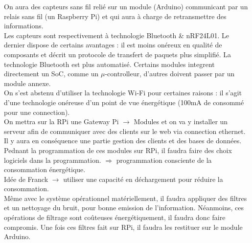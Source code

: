 \documentclass[10pt]{article}
\begin{document}
On aura des capteurs sans fil relié sur un module (Arduino) communicant par un
relais sans fil (un Raspberry Pi) et qui aura à charge de retransmettre des
informations.\\
Les capteurs sont respectivement à technologie Bluetooth \& nRF24L01. Le dernier
dispose de certains avantages : il est moins onéreux en qualité de composants et
décrit un protocole de transfert de paquets plus simplifié. La technologie
Bluetooth est plus automatisé.
Certains modules integrent directement un SoC, comme un $\mu$-controlleur, d'autres
doivent passer par un module annexe.\\
On s'est abstenu d'utiliser la technologie Wi-Fi pour certaines raisons : il s'agit
d'une technologie onéreuse d'un point de vue énergétique (100mA de consommé pour
une connection).\\
On mettra sur la RPi une Gateway Pi $\rightarrow$ Modules et on va y installer un
serveur afin de communiquer avec des clients sur le web via connection ethernet.
Il y aura en conséquence une partie gestion des clients et des bases de données.\\
Pednant la programmation de ces modules sur RPi, il faudra faire des choix
logiciels dans la programmation. $\Rightarrow$ programmation consciente de la
consommation énergétique.\\
Idée de Franck $\rightarrow$ utiliser une capacité en déchargement pour réduire
la consommation.\\
Même avec le système opérationnel matériellement, il faudra appliquer des filtres
et un nettoyage du bruit, pour bonne emission de l'information. Néanmoins, ces
opérations de filtrage sont coûteuses énergétiquement, il faudra donc faire
compromis. Une fois ces filtres fait sur RPi, il faudra les restituer sur le
module Arduino.
\end{document}
